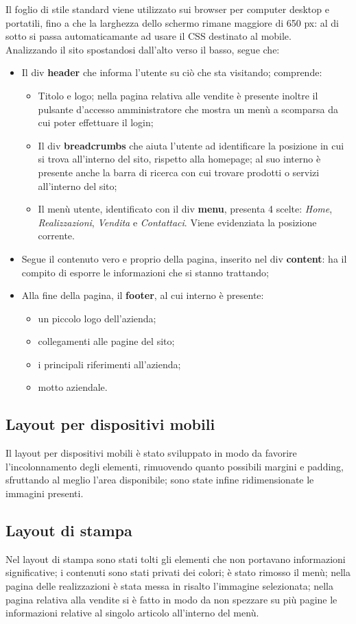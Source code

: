{{		Il foglio di stile standard viene utilizzato sui browser per computer desktop e portatili, fino a che la larghezza dello schermo rimane maggiore di 650 px: al di sotto si passa automaticamante ad usare il CSS destinato al mobile.
		\\
		Analizzando il sito spostandosi dall'alto verso il basso, segue che:
		\begin{itemize}\itemsep1pt
			\item Il div \textbf{header} che informa l'utente su ciò che sta visitando; comprende:
			\begin{itemize}\itemsep1pt
				\item Titolo e logo; nella pagina relativa alle vendite è presente inoltre il pulsante d'accesso amministratore che mostra un menù a scomparsa da cui poter effettuare il login;
				\item Il div \textbf{breadcrumbs} che aiuta l'utente ad identificare la posizione in cui si trova all'interno del sito, rispetto alla homepage; al suo interno è presente anche la barra di ricerca con cui trovare prodotti o servizi all'interno del sito;
				\item Il menù utente, identificato con il div \textbf{menu}, presenta 4 scelte: \textit{Home}, \textit{Realizzazioni}, \textit{Vendita} e \textit{Contattaci}. Viene evidenziata la posizione corrente. 
			\end{itemize}
			\item Segue il contenuto vero e proprio della pagina, inserito nel div \textbf{content}: ha il compito di esporre le informazioni che si stanno trattando;
			\item Alla fine della pagina, il \textbf{footer}, al cui interno è presente:
			\begin{itemize}\itemsep1pt
				\item un piccolo logo dell'azienda;
				\item collegamenti alle pagine del sito;
				\item i principali riferimenti all'azienda;
				\item motto aziendale.
			\end{itemize}
		\end{itemize}
		}
	\subsection{Layout per dispositivi mobili}{
		Il layout per dispositivi mobili è stato sviluppato in modo da favorire l'incolonnamento degli elementi, rimuovendo quanto possibili margini e padding, sfruttando al meglio l'area disponibile; sono state infine ridimensionate le immagini presenti.
	}
	\subsection{Layout di stampa}{
		Nel layout di stampa sono stati tolti gli elementi che non portavano informazioni significative; i contenuti sono stati privati dei colori; è stato rimosso il menù; nella pagina delle realizzazioni è stata messa in risalto l'immagine selezionata; nella pagina relativa alla vendite si è fatto in modo da non spezzare su più pagine le informazioni relative al singolo articolo all'interno del menù.
	}
}